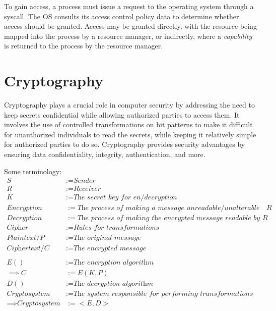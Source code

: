 \documentclass{report}
\newcommand{\asideBegin}[1]{\begin{tcolorbox}[colback=orange!5!white,colframe=black!75!orange,title={Aside:
      #1}]}
\newcommand{\asideEnd}{\end{tcolorbox}}
\begin{document}
To gain access, a process must issue a request to the operating system through a syscall. The OS
consults its access control policy data to determine whether access should be granted. Access may be
granted directly, with the resource being mapped into the process by a resource manager, or
indirectly, where a \textit{capability} is returned to the process by the resource manager.





\section{Cryptography}
Cryptography plays a crucial role in computer security by addressing the need to keep secrets
confidential while allowing authorized parties to access them. It involves the use of controlled
transformations on bit patterns to make it difficult for unauthorized individuals to read the
secrets, while keeping it relatively simple for authorized parties to do so. Cryptography provides
security advantages by ensuring data confidentiality, integrity, authentication, and more. 

\asideBegin{Terminology}
Some terminology:
\begin{align*}
  S &:= \textit{Sender} \\
  R &:= \textit{Receiver} \\
  K &:= \textit{The secret key for en/decryption} \\
  \textit{Encryption} &:= \textit{The process of making a message unreadable/unalterable by
  anyone but } R \\
  \textit{Decryption} &:= \textit{The process of making the encrypted message readable by } R \\
  \textit{Cipher} &:= \textit{Rules for transformations} \\
  \textit{Plaintext/}P &:= \textit{The original message} \\
  \textit{Ciphertext/}C &:= \textit{The encrypted message} \\ \\
  E() &:= \textit{The encryption algorithm} \\
  \implies C &:= E(K, P) \\
  D() &:= \textit{The decryption algorithm} \\
  \textit{Cryptosystem} &:= \textit{The system responsible for performing transformations on
  messages} \\
  \implies \textit{Cryptosystem} &:= <E, D>
\end{align*}
\asideEnd
\end{document}

